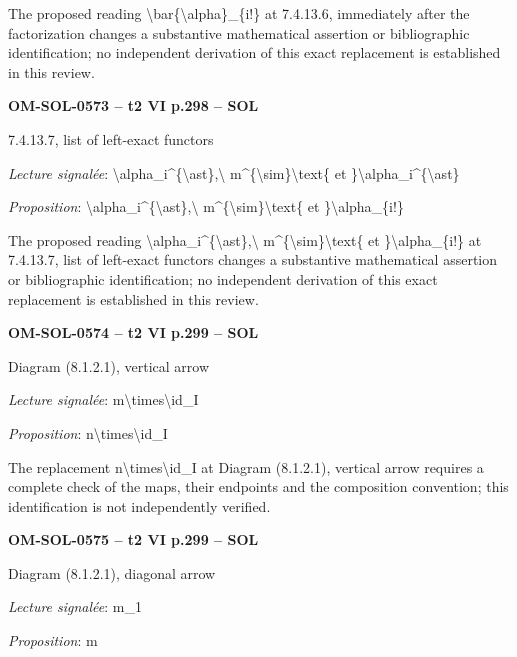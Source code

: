 The proposed reading \textbackslash{}bar\{\textbackslash{}alpha\}\_\{i!\} at 7.4.13.6, immediately after the factorization changes a substantive mathematical assertion or bibliographic identification; no independent derivation of this exact replacement is established in this review.\par
\par\noindent\textbf{OM-SOL-0573 -- t2 VI p.298 -- SOL}\par
7.4.13.7, list of left-exact functors\par
\emph{Lecture signalée}: \textbackslash{}alpha\_i\textasciicircum{}\{\textbackslash{}ast\},\textbackslash{} m\textasciicircum{}\{\textbackslash{}sim\}\textbackslash{}text\{ et \}\textbackslash{}alpha\_i\textasciicircum{}\{\textbackslash{}ast\}\par
\emph{Proposition}: \textbackslash{}alpha\_i\textasciicircum{}\{\textbackslash{}ast\},\textbackslash{} m\textasciicircum{}\{\textbackslash{}sim\}\textbackslash{}text\{ et \}\textbackslash{}alpha\_\{i!\}\par
The proposed reading \textbackslash{}alpha\_i\textasciicircum{}\{\textbackslash{}ast\},\textbackslash{} m\textasciicircum{}\{\textbackslash{}sim\}\textbackslash{}text\{ et \}\textbackslash{}alpha\_\{i!\} at 7.4.13.7, list of left-exact functors changes a substantive mathematical assertion or bibliographic identification; no independent derivation of this exact replacement is established in this review.\par
\par\noindent\textbf{OM-SOL-0574 -- t2 VI p.299 -- SOL}\par
Diagram (8.1.2.1), vertical arrow\par
\emph{Lecture signalée}: m\textbackslash{}times\textbackslash{}id\_I\par
\emph{Proposition}: n\textbackslash{}times\textbackslash{}id\_I\par
The replacement n\textbackslash{}times\textbackslash{}id\_I at Diagram (8.1.2.1), vertical arrow requires a complete check of the maps, their endpoints and the composition convention; this identification is not independently verified.\par
\par\noindent\textbf{OM-SOL-0575 -- t2 VI p.299 -- SOL}\par
Diagram (8.1.2.1), diagonal arrow\par
\emph{Lecture signalée}: m\_1\par
\emph{Proposition}: m\par
